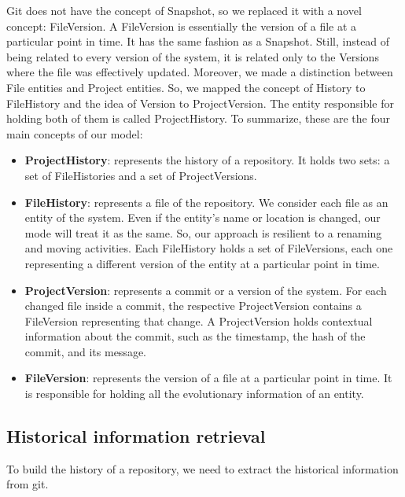Git does not have the concept of Snapshot, so we replaced it with a novel concept: FileVersion. 
A FileVersion is essentially the version of a file at a particular point in time. 
It has the same fashion as a Snapshot. Still, instead of being related to every version of the system, it is related only to the Versions where the file was effectively updated.
Moreover, we made a distinction between File entities and Project entities. So, we mapped the concept of History to FileHistory and the idea of Version to ProjectVersion. 
The entity responsible for holding both of them is called ProjectHistory. 
To summarize, these are the four main concepts of our model: 
\begin{itemize}
    \item \textbf{ProjectHistory}: represents the history of a repository. It holds two sets: a set of FileHistories and a set of ProjectVersions. 
    \item \textbf{FileHistory}: represents a file of the repository. We consider each file as an entity of the system. Even if the entity's name or location is changed, our mode will treat it as the same. So, our approach is resilient to a renaming and moving activities. Each FileHistory holds a set of FileVersions, each one representing a different version of the entity at a particular point in time.  
    \item \textbf{ProjectVersion}: represents a commit or a version of the system. 
    For each changed file inside a commit, the respective ProjectVersion contains a FileVersion representing that change.
    A ProjectVersion holds contextual information about the commit, such as the timestamp, the hash of the commit, and its message.
    \item \textbf{FileVersion}: represents the version of a file at a particular point in time.
    It is responsible for holding all the evolutionary information of an entity. 
\end{itemize}

\subsection*{Historical information retrieval}
To build the history of a repository, we need to extract the historical information from git.\\

